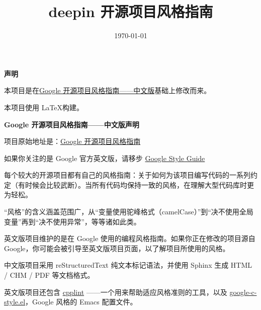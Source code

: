 \documentclass[UTF8,a4paper,oneside]{ctexbook}
\title{deepin 开源项目风格指南}
\date{\today}
\begin{document}
\maketitle

\textbf{声明}

本项目是在\href{https://github.com/zh-google-styleguide/zh-google-styleguide}{Google 开源项目风格指南——中文版}基础上修改而来。

本项目使用 \LaTeX 构建。

\textbf{Google 开源项目风格指南——中文版声明}

项目原始地址是：\href{https://github.com/zh-google-styleguide/zh-google-styleguide}{Google 开源项目风格指南}

如果你关注的是 Google 官方英文版，请移步 \href{https://github.com/google/styleguide}{Google Style Guide}

每个较大的开源项目都有自己的风格指南：关于如何为该项目编写代码的一系列约定（有时候会比较武断）。当所有代码均保持一致的风格，在理解大型代码库时更为轻松。

“风格”的含义涵盖范围广，从“变量使用驼峰格式（camelCase）”到“决不使用全局变量”再到“决不使用异常”，等等诸如此类。

英文版项目维护的是在 Google 使用的编程风格指南。如果你正在修改的项目源自 Google，你可能会被引导至英文版项目页面，以了解项目所使用的风格。

中文版项目采用 reStructuredText 纯文本标记语法，并使用 Sphinx 生成 HTML / CHM / PDF 等文档格式。

英文版项目还包含 \href{https://github.com/google/styleguide/tree/gh-pages/cpplint}{cpplint} ——一个用来帮助适应风格准则的工具，以及 \href{https://raw.githubusercontent.com/google/styleguide/gh-pages/google-c-style.el}{google-c-style.el}，Google 风格的 Emacs 配置文件。

\tableofcontents
\newpage



\end{document}
